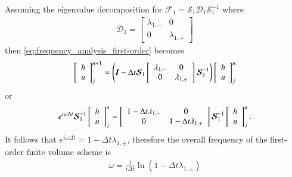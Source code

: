 \documentclass[preprint,sort&compress,1p]{article}
\begin{document}
Assuming the eigenvalue decomposition for $\boldsymbol{\mathcal{F}}_1 = \boldsymbol{\mathcal{S}}_1 \boldsymbol{\mathcal{D}}_1 \boldsymbol{\mathcal{S}}_1^{-1}$ where
\begin{align}
\boldsymbol{\mathcal{D}}_1 = \left[\begin{array}{cc}
\lambda_{1,-}  & 0 \\0  &  \lambda_{1,+}
\end{array}\right]
\end{align}
then \eqref{eq:frequency_analysis_first-order} becomes
\begin{align}
\left[\begin{array}{c}
h \\ u
\end{array}\right]^{n+1}_j = \left(\boldsymbol{I} - \Delta t\boldsymbol{\mathcal{S}}_1 \left[\begin{array}{c c}
\lambda_{1,-}  & 0 \\0  & \lambda_{1,+}
\end{array}\right] \boldsymbol{\mathcal{S}}_1^{-1} \right)\left[\begin{array}{c}
h \\ u
\end{array}\right]^{n}_j
\end{align}
or
\begin{align}
e^{i \omega \Delta t}\boldsymbol{\mathcal{S}}_1^{-1}\left[\begin{array}{c}
h \\ u
\end{array}\right]^{n}_j = \left[\begin{array}{c c}
1 - \Delta t\lambda_{1,-}  & 0 \\0  & 1- \Delta t\lambda_{1,+}
\end{array}\right] \boldsymbol{\mathcal{S}}_1^{-1}\left[\begin{array}{c}
h \\ u
\end{array}\right]^{n}_j.
\end{align}
It follows that $e^{i\omega\Delta t} = 1 - \Delta t\lambda_{1,\pm}$, therefore the overall frequency of the first-order finite volume scheme is
\begin{align}
\label{eq:omega_first-order}
\omega = \frac{1}{i \Delta t} \ln \left(1 - \Delta t\lambda_{1,\pm}\right)
\end{align}
\end{document}
